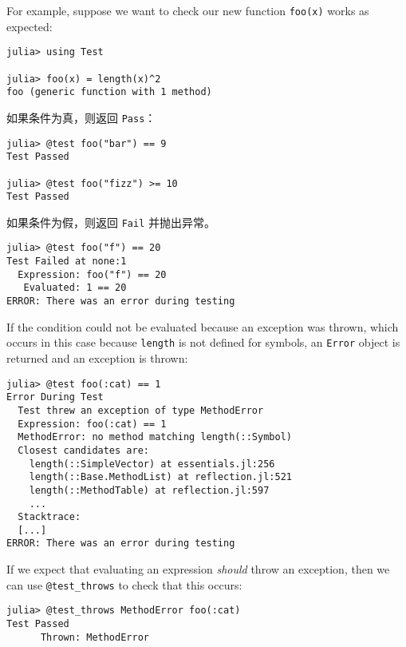 For example, suppose we want to check our new function \texttt{foo(x)} works as expected:




\begin{verbatim}
julia> using Test

julia> foo(x) = length(x)^2
foo (generic function with 1 method)
\end{verbatim}



如果条件为真，则返回 \texttt{Pass}：




\begin{verbatim}
julia> @test foo("bar") == 9
Test Passed

julia> @test foo("fizz") >= 10
Test Passed
\end{verbatim}



如果条件为假，则返回 \texttt{Fail} 并抛出异常。




\begin{verbatim}
julia> @test foo("f") == 20
Test Failed at none:1
  Expression: foo("f") == 20
   Evaluated: 1 == 20
ERROR: There was an error during testing
\end{verbatim}



If the condition could not be evaluated because an exception was thrown, which occurs in this case because \texttt{length} is not defined for symbols, an \texttt{Error} object is returned and an exception is thrown:




\begin{verbatim}
julia> @test foo(:cat) == 1
Error During Test
  Test threw an exception of type MethodError
  Expression: foo(:cat) == 1
  MethodError: no method matching length(::Symbol)
  Closest candidates are:
    length(::SimpleVector) at essentials.jl:256
    length(::Base.MethodList) at reflection.jl:521
    length(::MethodTable) at reflection.jl:597
    ...
  Stacktrace:
  [...]
ERROR: There was an error during testing
\end{verbatim}



If we expect that evaluating an expression \emph{should} throw an exception, then we can use \texttt{@test\_throws} to check that this occurs:




\begin{verbatim}
julia> @test_throws MethodError foo(:cat)
Test Passed
      Thrown: MethodError
\end{verbatim}



